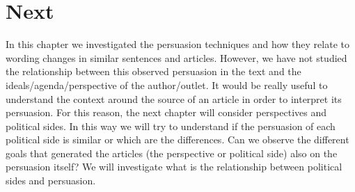 
\section{\statusgreen Next}
In this chapter we investigated the persuasion techniques and how they relate to wording changes in similar sentences and articles.
However, we have not studied the relationship between this observed persuasion in the text and the ideals/agenda/perspective of the author/outlet.
It would be really useful to understand the context around the source of an article in order to interpret its persuasion.
For this reason, the next chapter will consider perspectives and political sides.
In this way we will try to understand if the persuasion of each political side is similar or which are the differences.
Can we observe the different goals that generated the articles (the perspective or political side) also on the persuasion itself? We will investigate what is the relationship between political sides and persuasion.
